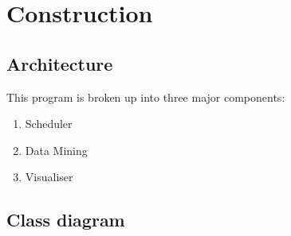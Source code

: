 \section{Construction}

\subsection{Architecture}
This program is broken up into three major components:
\begin{enumerate}
	\item Scheduler
	\item Data Mining
	\item Visualiser
\end{enumerate}

\subsection{Class diagram}